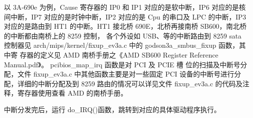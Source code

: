 以 3A-690e 为例，Cause 寄存器的 IP0 和 IP1
对应的是软中断，IP6 对应的是核间中断，IP7 对应的是时钟中断，IP2 对应的是 Cpu
的串口及 LPC 的中断，IP3 对应的是路由到 HT1 的中断。HT1 接北桥
690E，北桥再接南桥 SB600，南北桥的中断都由南桥上的 8259 控制， 各个外设如
USB、等的中断路由到 8259 sata 控制器见 arch/mips/kernel/fixup\_ev3a.c 中的
godson3a\_smbus\_fixup 函数，其中寄 存器的定义见 AMD 南桥手册之《AMD SB600
Register Reference Manual.pdf》。 pcibios\_map\_irq 函数是对 PCI 及 PCIE 槽
位的扫描及中断号分配，文件 fixup\_ev3a.c 中其他函数主要是对一些固定 PCI
设备的中断号进行分配，详细的中断分配及到 8259 路由的情况可以详见文件
fixup\_ev3a.c 的代码及注释，寄存器使用查看 AMD 的南桥手册。

中断分发完后，运行 do\_IRQ()函数，跳转到对应的具体驱动程序执行。

